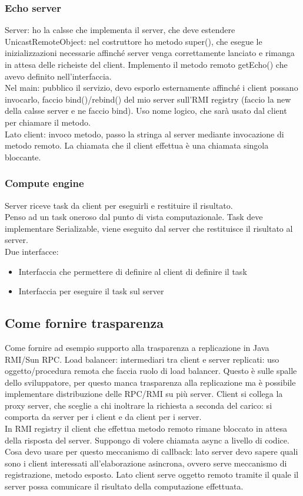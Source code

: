 \documentclass{article}
\begin{document}
\subsubsection{Echo server}
Server: ho la calsse che implementa il server, che deve estendere UnicastRemoteObject: nel costruttore ho metodo super(), che esegue le inizializzazioni necessarie affinché server venga correttamente lanciato e rimanga in attesa delle richeiste del client. Implemento il metodo remoto getEcho() che avevo definito nell'interfaccia.\\ Nel main: pubblico il servizio, devo esporlo esternamente affinché i client possano invocarlo, faccio bind()/rebind() del mio server sull'RMI registry (faccio la new della calsse server e ne faccio bind). Uso nome logico, che sarà usato dal client per chiamare il metodo.\\ Lato client: invoco metodo, passo la stringa al server mediante invocazione di metodo remoto. La chiamata che il client effettua è una chiamata singola bloccante.
\subsubsection{Compute engine}
Server riceve task da client per eseguirli e restituire il risultato.\\ Penso ad un task oneroso dal punto di vista computazionale. Task deve implementare Serializable, viene eseguito dal server che restituisce il risultato al server.\\ Due interfacce:
\begin{itemize}
\item Interfaccia che permettere di definire al client di definire il task
\item Interfaccia per eseguire il task sul server
\end{itemize}
\subsection{Come fornire trasparenza}
Come fornire ad esempio supporto alla trasparenza a replicazione in Java RMI/Sun RPC. Load balancer: intermediari tra client e server replicati: uso oggetto/procedura remota che faccia ruolo di load balancer. Questo è sulle spalle dello sviluppatore, per questo manca trasparenza alla replicazione ma è possibile implementare distribuzione delle RPC/RMI su più server. Client si collega la proxy server, che sceglie a chi inoltrare la richiesta a seconda del carico: si comporta da server per i client e da client per i server. \\ In RMI registry il client che effettua metodo remoto rimane bloccato in attesa della risposta del server. Suppongo di volere chiamata async a livello di codice.\\ Cosa devo usare per questo meccanismo di callback: lato server devo sapere quali sono i client interessati all'elaborazione asincrona, ovvero serve meccanismo di registrazione, metodo esposto. Lato client serve oggetto remoto tramite il quale il server possa comunicare il risultato della computazione effettuata.
\end{document}
